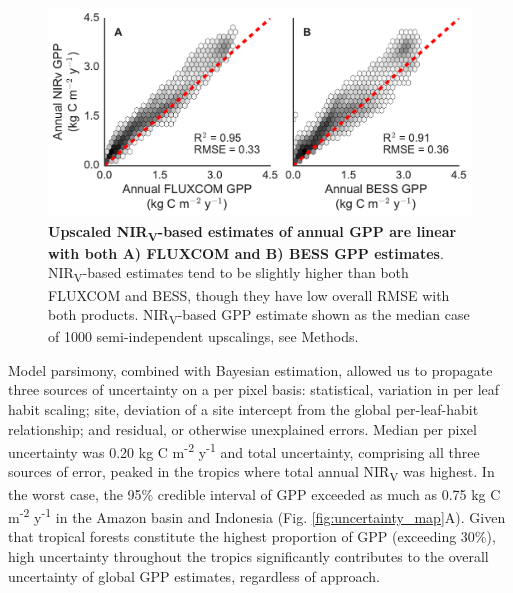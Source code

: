 \documentclass[10pt,letterpaper]{article}
\begin{document}
\begin{figure}[h]
    \centering
    \includegraphics[width=11.4cm, keepaspectratio]{figure_bess_fluxcom_area.pdf}
    \caption{\textbf{Upscaled NIR\textsubscript{V}-based estimates of annual GPP are linear with both A) FLUXCOM and B) BESS GPP estimates}.  NIR\textsubscript{V}-based estimates tend to be slightly higher than both FLUXCOM and BESS, though they have low overall RMSE with both products. NIR\textsubscript{V}-based GPP estimate shown as the median case of 1000 semi-independent upscalings, see Methods. }
    \label{fig:bess_fluxcom}
\end{figure}

Model parsimony, combined with Bayesian estimation, allowed us to propagate three sources of uncertainty on a per pixel basis: statistical, variation in per leaf habit scaling; site, deviation of a site intercept from the global per-leaf-habit relationship; and residual, or otherwise unexplained errors. Median per pixel uncertainty was 0.20 kg C m\textsuperscript{-2} y\textsuperscript{-1} and total uncertainty, comprising all three sources of error, peaked in the tropics where total annual NIR\textsubscript{V} was highest. In the worst case, the 95\% credible interval of GPP exceeded as much as 0.75 kg C m\textsuperscript{-2} y\textsuperscript{-1} in the Amazon basin and Indonesia (Fig. \ref{fig:uncertainty_map}A). Given that tropical forests constitute the highest proportion of GPP (exceeding 30\%), high uncertainty throughout the tropics significantly contributes to the overall uncertainty of global GPP estimates, regardless of approach. 
\end{document}
